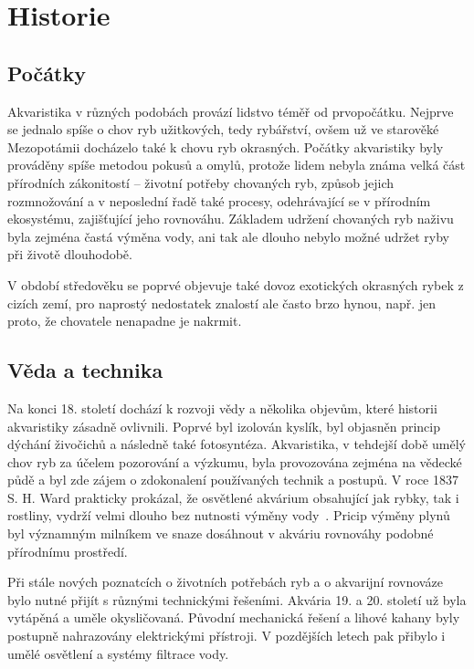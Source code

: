 \section{Historie}
\subsection{Počátky}
Akvaristika v různých podobách provází lidstvo téměř od prvopočátku. Nejprve se jednalo spíše o chov ryb užitkových, tedy rybářství, ovšem už ve starověké Mezopotámii docházelo také k chovu ryb okrasných. Počátky akvaristiky byly prováděny spíše metodou pokusů a omylů, protože lidem nebyla známa velká část přírodních zákonitostí -- životní potřeby chovaných ryb, způsob jejich rozmnožování a v neposlední řadě také procesy, odehrávající se v přírodním ekosystému, zajišťující jeho rovnováhu. Základem udržení chovaných ryb naživu byla zejména častá výměna vody, ani tak ale dlouho nebylo možné udržet ryby při životě dlouhodobě. 

V období středověku se poprvé objevuje také dovoz exotických okrasných rybek z cizích zemí, pro naprostý nedostatek znalostí ale často brzo hynou, např. jen proto, že chovatele nenapadne je nakrmit. 

\subsection{Věda a technika}
Na konci 18. století dochází k rozvoji vědy a několika objevům, které historii akvaristiky zásadně ovlivnili. Poprvé byl izolován kyslík, byl objasněn princip dýchání živočichů a následně také fotosyntéza. Akvaristika, v tehdejší době umělý chov ryb za účelem pozorování a výzkumu, byla provozována zejména na vědecké půdě a byl zde zájem o zdokonalení používaných technik a postupů. V roce 1837 S. H. Ward prakticky prokázal, že osvětlené akvárium obsahující jak rybky, tak i rostliny, vydrží velmi dlouho bez nutnosti výměny vody~\cite{vitek_akvaristika}. Pricip výměny plynů byl významným milníkem ve snaze dosáhnout v akváriu rovnováhy podobné přírodnímu prostředí. 

Při stále nových poznatcích o životních potřebách ryb a o akvarijní rovnováze bylo nutné přijít s různými technickými řešeními. Akvária 19. a 20. století už byla vytápěná a uměle okysličovaná. Původní mechanická řešení a lihové kahany byly postupně nahrazovány elektrickými přístroji. V pozdějších letech pak přibylo i umělé osvětlení a systémy filtrace vody. 